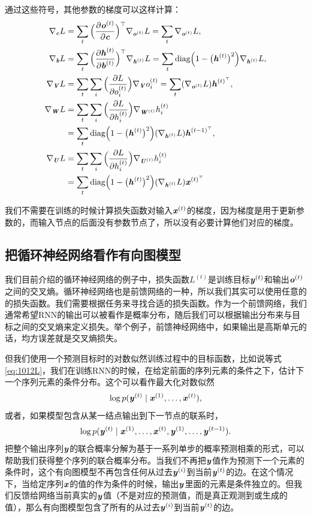 通过这些符号，其他参数的梯度可以这样计算：
\begin{align}
 \nabla_{\boldsymbol{\mathit{c}}} L &=  \sum_t \Big( \frac{\partial \boldsymbol{\mathit{o}}^{(t)}}{\partial \boldsymbol{\mathit{c}}} \Big)^\top \nabla_{\boldsymbol{\mathit{o}}^{(t)}} L 
 = \sum_t \nabla_{\boldsymbol{\mathit{o}}^{(t)}} L ,\\
 \nabla_{\boldsymbol{\mathit{b}}} L &= \sum_t \Big( \frac{\partial \boldsymbol{\mathit{h}}^{(t)}}{\partial \boldsymbol{\mathit{b}}^{(t)}} \Big)^\top \nabla_{\boldsymbol{\mathit{h}}^{(t)}} L 
 = \sum_t \text{diag} \Big( 1 - \big( \boldsymbol{\mathit{h}}^{(t)} \big)^2 \Big)  \nabla_{\boldsymbol{\mathit{h}}^{(t)}} L  ,\\
 \nabla_{\boldsymbol{\mathit{V}}} L &= \sum_t \sum_i \Big( \frac{\partial L} {\partial o_i^{(t)}}\Big) \nabla_{\boldsymbol{\mathit{V}}} o_i^{(t)} 
 = \sum_t (\nabla_{\boldsymbol{\mathit{o}}^{(t)}} L) \boldsymbol{\mathit{h}}^{(t)^\top},\\
 \nabla_{\boldsymbol{\mathit{W}}} L &= \sum_t \sum_i \Big( \frac{\partial L} {\partial h_i^{(t)}}\Big) 
 \nabla_{\boldsymbol{\mathit{W}}^{(t)}} h_i^{(t)} \\
&= \sum_t \text{diag} \Big( 1 - \big( \boldsymbol{\mathit{h}}^{(t)} \big)^2 \Big) ( \nabla_{\boldsymbol{\mathit{h}}^{(t)}} L) \boldsymbol{\mathit{h}}^{(t-1)^\top} ,\\
 \nabla_{\boldsymbol{\mathit{U}}} L &= \sum_t \sum_i \Big( \frac{\partial L} {\partial h_i^{(t)}}\Big) 
 \nabla_{\boldsymbol{\mathit{U}}^{(t)}} h_i^{(t)} \\
&= \sum_t \text{diag} \Big( 1 - \big( \boldsymbol{\mathit{h}}^{(t)} \big)^2 \Big) ( \nabla_{\boldsymbol{\mathit{h}}^{(t)}} L) \boldsymbol{\mathit{x}}^{(t)^\top} 
\end{align}

我们不需要在训练的时候计算损失函数对输入$\boldsymbol{\mathit{x}}^{(t)}$的梯度，因为梯度是用于更新参数的，而输入节点的后面没有参数节点了，所以没有必要计算他们对应的梯度。

\subsection{把循环神经网络看作有向图模型}
我们目前介绍的循环神经网络的例子中，损失函数$L^{(t)}$是训练目标$\boldsymbol{\mathit{y}}^{(t)}$和输出$\boldsymbol{\mathit{o}}^{(t)}$之间的交叉熵。循环神经网络也是前馈网络的一种，所以我们其实可以使用任意的的损失函数。我们需要根据任务来寻找合适的损失函数。作为一个前馈网络，我们通常希望RNN的输出可以被看作是概率分布，随后我们可以根据输出分布来与目标之间的交叉熵来定义损失。举个例子，前馈神经网络中，如果输出是高斯单元的话，均方误差就是交叉熵损失。

但我们使用一个预测目标时的对数似然训练过程中的目标函数，比如说等式\ref{eq:1012L}，我们在训练RNN的时候，在给定前面的序列元素的条件之下，估计下一个序列元素的条件分布。这个可以看作最大化对数似然
\begin{align}
 \log p(\boldsymbol{\mathit{y}}^{(t)} \mid \boldsymbol{\mathit{x}}^{(1)},\dots, \boldsymbol{\mathit{x}}^{(t)}),
\end{align}
或者，如果模型包含从某一结点输出到下一节点的联系时，
\begin{align}
 \log p(\boldsymbol{\mathit{y}}^{(t)} \mid \boldsymbol{\mathit{x}}^{(1)},\dots, \boldsymbol{\mathit{x}}^{(t)},\boldsymbol{\mathit{y}}^{(1)},\dots, \boldsymbol{\mathit{y}}^{(t-1)} ).
\end{align}
把整个输出序列$\boldsymbol{\mathit{y}}$的联合概率分解为基于一系列单步的概率预测相乘的形式，可以帮助我们获得整个序列的联合概率分布。当我们不再把$\boldsymbol{\mathit{y}}$值作为预测下一个元素的条件时，这个有向图模型不再包含任何从过去$\boldsymbol{\mathit{y}}^{(i)}$到当前$\boldsymbol{\mathit{y}}^{(t)}$的边。在这个情况下，当给定序列$\boldsymbol{\mathit{x}}$的值的作为条件的时候，输出$\boldsymbol{\mathit{y}}$里面的元素是条件独立的。但我们反馈给网络当前真实的$\boldsymbol{\mathit{y}}$值（不是对应的预测值，而是真正观测到或生成的值），那么有向图模型包含了所有的从过去$\boldsymbol{\mathit{y}}^{(i)}$到当前$\boldsymbol{\mathit{y}}^{(t)}$的边。

